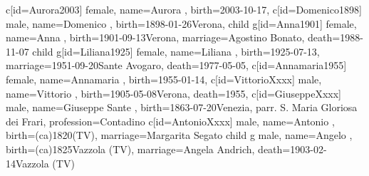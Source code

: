 \documentclass{article}
\begin{document}
\begin{midpage}
\begin{center}
\begin{genealogypicture}
{{{{{{{{{                                }
                                c[id=Aurora2003]{
                                    female,
                                    name={Aurora },
                                    birth={2003-10-17}{},
                                }
                            }
                        }
                    }
                    c[id=Domenico1898]{
                        male,
                        name={Domenico },
                        birth={1898-01-26}{Verona},
                    }
                    child{
                        g[id=Anna1901]{
                            female,
                            name={Anna },
                            birth={1901-09-13}{Verona},
                            marriage={Agostino Bonato}{},
                            death={1988-11-07}{}
                        }
                        child{
                            g[id=Liliana1925]{
                                female,
                                name={Liliana },
                                birth={1925-07-13}{},
                                marriage={1951-09-20}{Sante Avogaro},
                                death={1977-05-05}{},
                            }
                            c[id=Annamaria1955]{
                                female,
                                name={Annamaria },
                                birth={1955-01-14}{},
                            }
                        }
                    }
                    c[id=VittorioXxxx]{
                        male,
                        name={Vittorio },
                        birth={1905-05-08}{Verona},
                        death={1955}{},
                    }
                }
                c[id=GiuseppeXxxx]{
                    male,
                    name={Giuseppe Sante },
                    birth={1863-07-20}{Venezia, parr. S. Maria Gloriosa dei Frari},
                    profession={Contadino}
                }
            }
            c[id=AntonioXxxx]{
                male,
                name={Antonio },
                birth={(ca)1820}{(TV)},
                marriage={Margarita Segato}{}
            }
            child{
                g{
                    male,
                    name={Angelo },
                    birth={(ca)1825}{Vazzola (TV)},
                    marriage={Angela Andrich}{},
                    death={1903-02-14}{Vazzola (TV)}
}}}}}
\end{genealogypicture}
\end{center}
\end{midpage}
\end{document}
